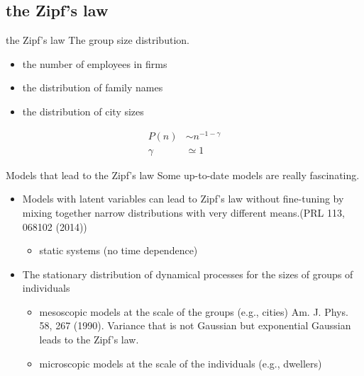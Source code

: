 \documentclass{beamer}
\begin{document}
\subsection{the Zipf's law}
\begin{frame}{the Zipf's law}
  The group size distribution.
  \begin{itemize}
    \item the number of employees in firms
    \item the distribution of family names
    \item the distribution of city sizes
    
  \end{itemize}

  \begin{align}
    P(n)&\sim n^{-1-\gamma}\\
    \gamma&\simeq 1
  \end{align}
  
\end{frame}

\begin{frame}{Models that lead to the Zipf's law}
Some up-to-date models are really fascinating.
  \begin{itemize}
    \item Models with latent variables can lead to Zipf's law without fine-tuning by mixing together narrow distributions with very different means.(PRL 113, 068102 (2014))
    \begin{itemize}
      \item static systems (no time dependence)
    \end{itemize}
    \item The stationary distribution of dynamical processes for the sizes of groups of individuals
    \begin{itemize}
      \item mesoscopic models at the scale of the groups (e.g., cities) Am. J. Phys. 58, 267 (1990). Variance that is not Gaussian but exponential Gaussian leads to the Zipf's law.
      \item microscopic models at the scale of the individuals (e.g., dwellers)
    \end{itemize}
  \end{itemize}
  
\end{frame}
\end{document}
